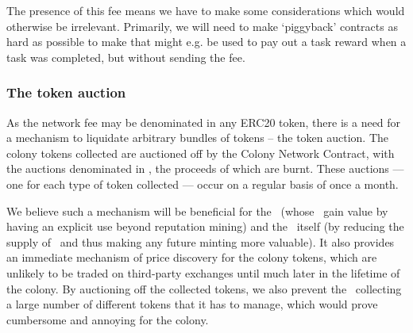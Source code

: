 The presence of this fee means we have to make some considerations which would otherwise be irrelevant. Primarily, we will need to make `piggyback' contracts as hard as possible to make that might e.g. be used to pay out a task reward when a task was completed, but without sending the fee.

\subsubsection{The token auction}
As the network fee may be denominated in any ERC20 token, there is a need for a mechanism to liquidate arbitrary bundles of tokens -- the token auction. The colony tokens collected are auctioned off by the Colony Network Contract, with the auctions denominated in \rcts, the proceeds of which are burnt. These auctions --- one for each type of token collected --- occur on a regular basis of once a month.

We believe such a mechanism will be beneficial for the \rcths\ (whose \rcts\ gain value by having an explicit use beyond reputation mining) and the \rc\ itself (by reducing the supply of \rcts\ and thus making any future minting more valuable). It also provides an immediate mechanism of price discovery for the colony tokens, which are unlikely to be traded on third-party exchanges until much later in the lifetime of the colony. By auctioning off the collected tokens, we also prevent the \rc\ collecting a large number of different tokens that it has to manage, which would prove cumbersome and annoying for the colony.



